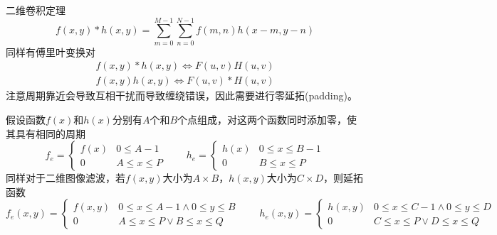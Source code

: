 二维卷积定理
\[f(x,y)*h(x,y)=\sum_{m=0}^{M-1}\sum_{n=0}^{N-1}f(m,n)h(x-m,y-n)\]
同样有傅里叶变换对
\[\begin{aligned}
f(x,y)*h(x,y)\iff F(u,v)H(u,v)\\
f(x,y)h(x,y) \iff F(u,v)*H(u,v)
\end{aligned}\]
注意周期靠近会导致互相干扰而导致缠绕错误，因此需要进行零延拓(padding)。

假设函数$f(x)$和$h(x)$分别有$A$个和$B$个点组成，对这两个函数同时添加零，使其具有相同的周期
\[f_e=\begin{cases}
f(x) & 0\leq A-1\\
0 & A\leq x\leq P
\end{cases}
\qquad
h_e=\begin{cases}
h(x) & 0\leq x\leq B-1\\
0 & B\leq x\leq P
\end{cases}\]
同样对于二维图像滤波，若$f(x,y)$大小为$A\times B$，$h(x,y)$大小为$C\times D$，则延拓函数
\[f_e(x,y)=\begin{cases}
f(x,y) & 0\leq x\leq A-1\land 0\leq y\leq B\\
0 & A\leq x\leq P\lor B\leq x\leq Q
\end{cases}
\qquad
h_e(x,y)=\begin{cases}
h(x,y) & 0\leq x\leq C-1\land 0\leq y\leq D\\
0 & C\leq x\leq P\lor D\leq x\leq Q
\end{cases}\]


